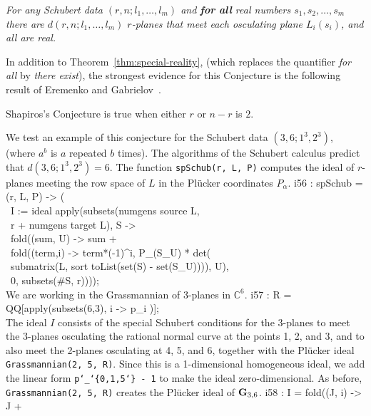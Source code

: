 {\it 
For any Schubert data $(r,n;l_1,\ldots,l_m)$ and {\bf for all} real numbers
$s_1,s_2,\ldots,s_m$ there are $d(r,n;l_1,\ldots,l_m)$
$r$-planes that meet each osculating plane $L_i(s_i)$, and all are real.
}\medskip

In addition to Theorem~\ref{thm:special-reality}, (which replaces the 
quantifier {\it for all}\/ by  {\it there exist}), the strongest evidence for
this Conjecture is the following result of Eremenko and
Gabrielov~\cite{SO:EG00}. 

\begin{theorem}
Shapiros's Conjecture is true when either $r$ or $n-r$ is $2$.
\end{theorem}

We test an example of this conjecture for the Schubert data
$(3,6;1^3,2^3)$, (where $a^b$ is $a$ repeated $b$ times).
The algorithms of the Schubert calculus predict that $d(3,6;1^3,2^3)=6$.
The function {\tt spSchub(r, L, P)} computes the ideal of $r$-planes meeting
the row space of $L$ in the Pl\"ucker coordinates $P_\alpha$.
%
\beginOutput
i56 : spSchub = (r, L, P) -> (\\
\           I := ideal apply(subsets(numgens source L, \\
\                            r + numgens target L), S -> \\
\                fold((sum, U) -> sum +\\
\                 fold((term,i) -> term*(-1)^i, P_(S_U) * det(\\
\                  submatrix(L, sort toList(set(S) - set(S_U)))), U), \\
\                     0, subsets(#S, r))));\\
\endOutput
%
We are working in the Grassmannian of 3-planes in 
${\mathbb C}^6$.
%
\beginOutput
i57 : R = QQ[apply(subsets(6,3), i -> p_i )];\\
\endOutput
%
The ideal $I$ consists of the
special Schubert conditions for the 3-planes to meet the 3-planes osculating
the rational normal curve at the points 1, 2, and 3, and to also meet the
2-planes osculating at 4, 5, and 6,
together with the Pl\"ucker ideal {\tt Grassmannian(2, 5, R)}.
Since this is a 1-dimensional homogeneous ideal, we add the linear form 
{\tt p{\char`\_}\char`\{0,1,5{\char`\}} - 1} to make the ideal
zero-dimensional.
As before, {\tt Grassmannian(2, 5, R)} creates the Pl\"ucker ideal of 
${\bf G}_{3,6}$.
%
\beginOutput
i58 : I = fold((J, i) -> J +\\
